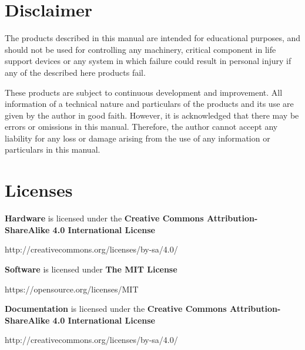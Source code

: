 \section*{Disclaimer}
The products described in this manual are intended for educational purposes,
and should not be used for controlling any machinery, critical component in
life support devices or any system in which failure could result in personal
injury if any of the described here products fail.

These products are subject to continuous development and improvement. All
information of a technical nature and particulars of the products and its
use are given by the author in good faith. However, it is acknowledged that
there may be errors or omissions in this manual. Therefore, the author
cannot accept any liability for any loss or damage arising from the use of
any information or particulars in this manual.

\section*{Licenses}
\small
\textbf{Hardware} is licensed under the \textbf{Creative Commons
Attribution-ShareAlike 4.0 International License}

\hspace{1cm}http://creativecommons.org/licenses/by-sa/4.0/

\textbf{Software} is licensed under \textbf{The MIT License}

\hspace{1cm}https://opensource.org/licenses/MIT

\textbf{Documentation} is licensed under the \textbf{Creative Commons
Attribution-ShareAlike 4.0 International License}

\hspace{1cm}http://creativecommons.org/licenses/by-sa/4.0/

\normalsize

\hrulefill
